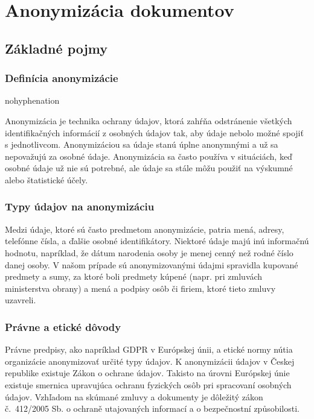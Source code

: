 \chapter{Anonymizácia dokumentov}
\label{chap:FirstChapter}

\section{Základné pojmy}
\subsection{Definícia anonymizácie}
\begin{hyphenrules}{nohyphenation}

Anonymizácia je technika ochrany údajov, ktorá zahŕňa odstránenie všetkých identifikačných informácií z osobných údajov tak, aby údaje nebolo možné spojiť s jednotlivcom. Anonymizáciou sa údaje stanú úplne anonymnými a už sa nepovažujú za osobné údaje. Anonymizácia sa často používa v situáciách, keď osobné údaje už nie sú potrebné, ale údaje sa stále môžu použiť na výskumné alebo štatistické účely.\cite{WebPomoc}

\subsection{Typy údajov na anonymizáciu}
Medzi údaje, ktoré sú často predmetom anonymizácie, patria mená, adresy, telefónne čísla, a ďalšie osobné identifikátory. Niektoré údaje majú inú informačnú hodnotu, napríklad, že dátum narodenia osoby je menej cenný než rodné číslo danej osoby. V našom prípade sú anonymizovanými údajmi spravidla kupované predmety a sumy, za ktoré boli predmety kúpené (napr. pri zmluvách ministerstva obrany) a mená a podpisy osôb či firiem, ktoré tieto zmluvy uzavreli.

\subsection{Právne a etické dôvody}


Právne predpisy, ako napríklad GDPR v Európskej únii, a etické normy nútia organizácie anonymizovať určité typy údajov. K anonymizácii údajov v Českej republike existuje Zákon o ochrane údajov.\cite{ZakonyProLidi2000-101} Takisto na úrovni Európskej únie existuje smernica upravujúca ochranu fyzických osôb pri spracovaní osobných údajov.\cite{lex-europa} Vzhľadom na skúmané zmluvy a dokumenty je dôležitý zákon č.~412/2005 Sb. o ochraně utajovaných informací a o bezpečnostní způsobilosti.\cite{ZakonyProLidi2005-412}

\end{hyphenrules}
